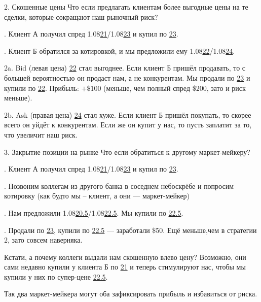 \documentclass{beamer}
\newcommand{\eurusdBigFigures}{1.08}
\begin{document}
\begin{frame}{2. Скошенные цены}
\justify
Что если предлагать клиентам более выгодные цены на те сделки, которые сокращают
наш рыночный риск?

. Клиент А получил спред \eurusdBigFigures\underline{21}/\eurusdBigFigures\underline{23} и купил по \underline{23}.

. Клиент Б обратился за котировкой, и мы предложили ему \eurusdBigFigures\underline{22}/\eurusdBigFigures\underline{24}.

\justify
2a. Bid (левая цена) \underline{22} стал выгоднее. Если клиент Б пришёл 
продавать, то с большей вероятностью он продаст нам, а не конкурентам.
Мы продали по \underline{23} и купили по \underline{22}. Прибыль: $+\$100$ (меньше, чем полный спред \$200, зато и риск меньше).

\justify
2b. Ask (правая цена) \underline{24} стал хуже. Если клиент Б пришёл покупать,
то скорее всего он уйдёт к конкурентам. Если же он купит у нас, то пусть заплатит за то, что увеличит наш риск.
\end{frame}



\begin{frame}{3. Закрытие позиции на рынке}
\justify
Что если обратиться к другому маркет-мейкеру?

. Клиент А получил спред \eurusdBigFigures\underline{21}/\eurusdBigFigures\underline{23} и купил по \underline{23}.

. Позвоним коллегам из другого банка в соседнем небоскрёбе и попросим 
котировку (как будто мы -- клиент, а они --- маркет-мейкер)

. Нам предложили \eurusdBigFigures\underline{20.5}/\eurusdBigFigures\underline{22.5}. Мы купили по \underline{22.5}.

. Продали по \underline{23}, купили по \underline{22.5} --- заработали \$50. 
Ещё меньше,чем в стратегии 2, зато совсем наверняка.

\justify
Кстати, а почему коллеги выдали нам скошенную влево цену? Возможно, они сами недавно купили у клиента Б по \underline{21} и теперь стимулируют нас, чтобы мы 
купили у них по супер-цене \underline{22.5}.

\justify
Так два маркет-мейкера могут оба зафиксировать прибыль и избавиться от риска.
\end{frame}
\end{document}
